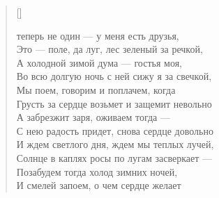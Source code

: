 \settowidth{\versewidth}{Это --- поле, да луг, лес зеленый за речкой,}
\begin{verse}[\versewidth]
\begin{patverse*}
 теперь не один --- у меня есть друзья,\\
Это --- поле, да луг, лес зеленый за речкой,\\
    А холодной зимой дума --- гостья моя,\\
Во всю долгую ночь с ней сижу я за свечкой,\\
    Мы поем, говорим и поплачем, когда\\
Грусть за сердце возьмет и защемит невольно\ldotst\\
    А забрезжит заря, оживаем тогда ---\\
С нею радость придет, снова сердце довольно\ldotst\\
    И ждем светлого дня, ждем мы теплых лучей,\\
Солнце в каплях росы по лугам засверкает ---\\
    Позабудем тогда холод зимних ночей,\\
И смелей запоем, о чем сердце желает\ldotst
\end{patverse*}
\end{verse}

\newpage
\vspace*{0cm}


